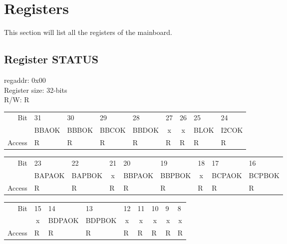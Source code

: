 \section{Registers}
This section will list all the registers of the mainboard.
\subsection{Register STATUS}
regaddr: 0x00\\
Register size: 32-bits\\
R/W: R\\
\begin{table}[h!]
    \centering
\begin{tabular}{rp{1.25cm}p{1.25cm}p{1.25cm}p{1.25cm}p{1.25cm}p{1.25cm}p{1.25cm}p{1.25cm}}
Bit &
  31 &
  30 &
  29 &
  28 &
  27 &
  26 &
  25 &
  24 \\ \cline{2-9} 
\multicolumn{1}{r|}{} &
  \multicolumn{1}{c|}{\scriptsize{BBAOK}} &
  \multicolumn{1}{c|}{\scriptsize{BBBOK}} & 
  \multicolumn{1}{c|}{\scriptsize{BBCOK}} &
  \multicolumn{1}{c|}{\scriptsize{BBDOK}} &
  \multicolumn{1}{c|}{\scriptsize{x}} &
  \multicolumn{1}{c|}{\scriptsize{x}} &
  \multicolumn{1}{c|}{\scriptsize{BLOK}} &
  \multicolumn{1}{c|}{\scriptsize{I2COK}} \\\cline{2-9} 
Access &
  R &
  R &
  R &
  R &
  R &
  R &
  R &
  R
\end{tabular}
\begin{tabular}{rp{1.25cm}p{1.25cm}p{1.25cm}p{1.25cm}p{1.25cm}p{1.25cm}p{1.25cm}p{1.25cm}}
Bit &
  23 &
  22 &
  21 &
  20 &
  19 &
  18 &
  17 &
  16 \\ \cline{2-9} 
\multicolumn{1}{r|}{} &
  \multicolumn{1}{c|}{\scriptsize{BAPAOK}} &
  \multicolumn{1}{c|}{\scriptsize{BAPBOK}} & 
  \multicolumn{1}{c|}{x} &
  \multicolumn{1}{c|}{\scriptsize{BBPAOK}} &
  \multicolumn{1}{c|}{\scriptsize{BBPBOK}} &
  \multicolumn{1}{c|}{x} &
  \multicolumn{1}{c|}{\scriptsize{BCPAOK}} &
  \multicolumn{1}{c|}{\scriptsize{BCPBOK}} \\\cline{2-9} 
Access &
  R &
  R &
  R &
  R &
  R &
  R &
  R &
  R
\end{tabular}
\begin{tabular}{rp{1.25cm}p{1.25cm}p{1.25cm}p{1.25cm}p{1.25cm}p{1.25cm}p{1.25cm}p{1.25cm}}
Bit &
  15 &
  14 &
  13 &
  12 &
  11 &
  10 &
  9 &
  8 \\ \cline{2-9} 
\multicolumn{1}{r|}{} &
  \multicolumn{1}{c|}{x} &
  \multicolumn{1}{c|}{\scriptsize{BDPAOK}} & 
  \multicolumn{1}{c|}{\scriptsize{BDPBOK}} &
  \multicolumn{1}{c|}{\scriptsize{x}} &
  \multicolumn{1}{c|}{\scriptsize{x}} &
  \multicolumn{1}{c|}{x} &
  \multicolumn{1}{c|}{\scriptsize{x}} &
  \multicolumn{1}{c|}{\scriptsize{x}} \\\cline{2-9} 
Access &
  R &
  R &
  R &
  R &
  R &
  R &
  R &
  R
\end{tabular}


\end{table}
